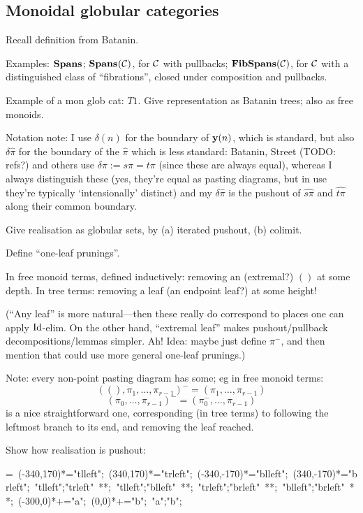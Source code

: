 \subsection*{Monoidal globular categories} Recall definition from Batanin. 

Examples: $\mathbf{Spans}_{}$; $\mathbf{Spans}_{}(\mathcal{C})$, for $\mathcal{C}$ with pullbacks; $\mathbf{FibSpans}(\mathcal{C})$, for $\mathcal{C}$ with a distinguished class of ``fibrations'', closed under composition and pullbacks.


Example of a mon glob cat: $T1$.  Give representation as Batanin trees; also as free monoids.

Notation note: I use $\delta(n)$ for the boundary of $\mathbf{y}(n)$, which is standard, but also $\delta \widehat{\pi}$ for the boundary of the $\widehat{\pi}$ which is less standard: Batanin, Street (TODO: refs?) and others use $\delta \pi := s \pi = t \pi$ (since these are always equal), whereas I always distinguish these (yes, they're equal as pasting diagrams, but in use they're typically `intensionally' distinct) and my $\delta \widehat{\pi}$ is the pushout of $\widehat{s\pi}$ and $\widehat{t\pi}$ along their common boundary. 

Give realisation as globular sets, by (a) iterated pushout, (b) colimit.

Define ``one-leaf prunings''.  

In free monoid terms, defined inductively: removing an (extremal?) $()$ at some depth.  In tree terms: removing a leaf (an endpoint leaf?) at some height!

(``Any leaf'' is more natural---then these really do correspond to places one can apply $\mathrm{Id}$-elim.  On the other hand, ``extremal leaf'' makes pushout/pullback decompositions/lemmas simpler.  Ah!  Idea: maybe just define $\pi^-$, and then mention that could use more general one-leaf prunings.)

Note: every non-point pasting diagram has some; eg in free monoid terms: 
$$((),\pi_1,\ldots,\pi_{r-1})^- = (\pi_1,\ldots,\pi_{r-1})$$
$$(\pi_0,\ldots,\pi_{r-1})^- = (\pi_0^-,\ldots,\pi_{r-1})$$
is a nice straightforward one, corresponding (in tree terms) to following the leftmost branch to its end, and removing the leaf reached.

Show how realisation is pushout:

\newbox\potlbox
\setbox\potlbox=\hbox{\xy 
(-340,170)*{}="tlleft"; %
(340,170)*{}="trleft";
(-340,-170)*{}="blleft";
(340,-170)*{}="brleft";
"tlleft";"trleft" **;
"tlleft";"blleft" **;
"trleft";"brleft" **;
"blleft";"brleft" **;
(-300,0)*+{\cdot}="a";
(0,0)*+{\cdot}="b";
{\ar "a";"b"};
\endxy}
\def\potl{\copy\potlbox}

